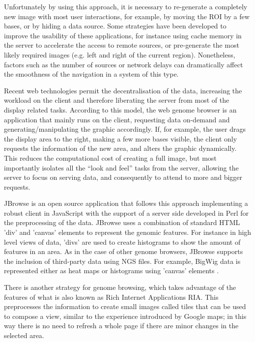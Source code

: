 Unfortunately by using this approach, it is necessary to re-generate a completely new image with most user interactions, for example, by moving the ROI by a few bases, or by hiding a data source. Some strategies have been developed to improve the usability of these applications, for instance using cache memory in the server to accelerate the access to remote sources, or pre-generate the most likely required images (e.g. left and right of the current region). Nonetheless, factors such as the number of sources or network delays can dramatically affect the smoothness of the navigation in a system of this type.

Recent web technologies permit the decentralisation of the data, increasing the workload on the client and therefore liberating the server from most of the display related tasks. According to this model, the web genome browser is an application that mainly runs on the client, requesting data on-demand and generating/manipulating the graphic accordingly. If, for example, the user drags the display area to the right, making a few more bases visible, the client only requests the information of the new area, and alters the graphic dynamically. This reduces the computational cost of creating a full image, but most importantly isolates all the ``look and feel'' tasks from the server, allowing the server to focus on serving data, and consequently to attend to more and bigger requests.

JBrowse is an open source application that follows this approach implementing a robust client in JavaScript with the support of a server side developed in Perl for the preprocessing of the data. JBrowse uses a combination of standard HTML 'div' and 'canvas' elements to represent the genomic features. For instance in high level views of data, 'divs' are used to create histograms to show the amount of features in an area. As in the case of other genome browsers, JBrowse supports the inclusion of third-party data using NGS files. For example, BigWig data is represented either as heat maps or histograms using 'canvas' elements \cite{LEE2013}.

There is another strategy for genome browsing, which takes advantage of the features of what is also known as Rich Internet Applications RIA. This preprocesses the information to create small images called tiles that can be used to compose a view, similar to the experience introduced by Google maps; in this way there is no need to refresh a whole page if there are minor changes in the selected area. 


